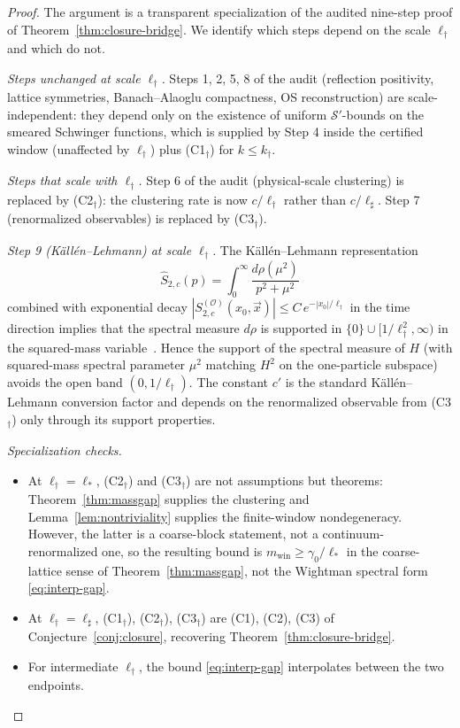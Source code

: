 \documentclass[11pt]{article}
\theoremstyle{definition}
\begin{document}
\begin{proof}
The argument is a transparent specialization of the audited nine-step
proof of Theorem~\ref{thm:closure-bridge}.  We identify which steps
depend on the scale $\ell_\dagger$ and which do not.

\emph{Steps unchanged at scale $\ell_\dagger$.}  Steps 1, 2, 5, 8 of
the audit
(reflection positivity, lattice symmetries, Banach--Alaoglu compactness,
OS reconstruction) are scale-independent: they depend only on the
existence of uniform $\mathcal S'$-bounds on the smeared Schwinger
functions, which is supplied by Step 4 inside the certified window
(unaffected by $\ell_\dagger$) plus
\textup{(C1$_\dagger$)} for $k\le k_\dagger$.

\emph{Steps that scale with $\ell_\dagger$.}  Step 6 of the audit
(physical-scale clustering) is replaced by
\textup{(C2$_\dagger$)}: the clustering rate is now $c/\ell_\dagger$
rather than $c/\ell_\sharp$.  Step 7 (renormalized observables) is
replaced by \textup{(C3$_\dagger$)}.

\emph{Step 9 \textup{(}K\"all\'en--Lehmann\textup{)} at scale $\ell_\dagger$.}
The K\"all\'en--Lehmann representation
\[
\hat S_{2,c}(p)=\int_0^\infty\frac{d\rho(\mu^2)}{p^2+\mu^2}
\]
combined with exponential decay
$|S_{2,c}^{(\mathcal O)}(x_0,\vec x)|\le C\,e^{-|x_0|/\ell_\dagger}$
in the time direction implies that the spectral measure $d\rho$ is
supported in $\{0\}\cup[1/\ell_\dagger^2,\infty)$ in the squared-mass
variable~\cite{StreaterWightman}.  Hence the support of the spectral
measure of $H$ \textup{(}with squared-mass spectral parameter $\mu^2$
matching $H^2$ on the one-particle subspace\textup{)} avoids the open
band $(0, 1/\ell_\dagger)$.  The constant $c'$ is the standard
K\"all\'en--Lehmann conversion factor and depends on the renormalized
observable from \textup{(C3$_\dagger$)} only through its support
properties.

\emph{Specialization checks.}
\begin{itemize}[nosep]
\item At $\ell_\dagger=\ell_*$, \textup{(C2$_\dagger$)} and
\textup{(C3$_\dagger$)} are not assumptions but theorems:
Theorem~\ref{thm:massgap} supplies the clustering and
Lemma~\ref{lem:nontriviality} supplies the finite-window
nondegeneracy.  However, the latter is a coarse-block statement,
not a continuum-renormalized one, so the resulting bound is
$m_{\mathrm{win}}\ge\gamma_0/\ell_*$ in the coarse-lattice sense
of Theorem~\ref{thm:massgap}, not the Wightman spectral form
\eqref{eq:interp-gap}.
\item At $\ell_\dagger=\ell_\sharp$, \textup{(C1$_\dagger$)},
\textup{(C2$_\dagger$)}, \textup{(C3$_\dagger$)} are
\textup{(C1)}, \textup{(C2)}, \textup{(C3)} of
Conjecture~\ref{conj:closure}, recovering Theorem~\ref{thm:closure-bridge}.
\item For intermediate $\ell_\dagger$, the bound
\eqref{eq:interp-gap} interpolates between the two endpoints.
\end{itemize}
\end{proof}
\end{document}
